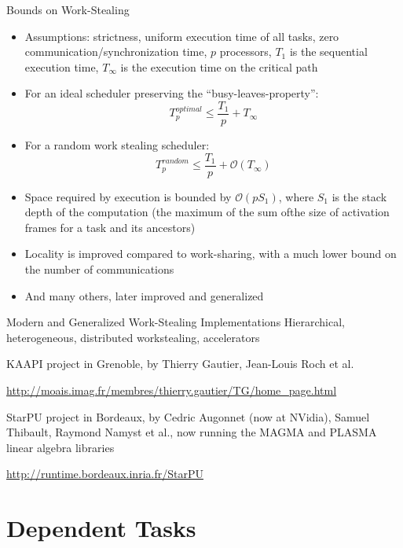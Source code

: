 \documentclass[xcolor=dvipsnames,9pt,mathserif]{beamer}
\def\le{\leqslant}
\begin{document}
\begin{frame}{Bounds on Work-Stealing}
  \begin{itemize}
  \item Assumptions: strictness, uniform execution time of all tasks,
    zero communication/synchronization time, $p$ processors, $T_1$ is
    the sequential execution time, $T_{\infty}$ is the execution time
    on the critical path
  \item For an ideal scheduler preserving the ``busy-leaves-property'':
    $$T^{\textit{optimal}}_p\le\frac{T_1}{p}+T_{\infty}$$
  \item For a random work stealing scheduler:
    $$T^{\textit{random}}_p\le\frac{T_1}{p}+\mathcal{O}(T_{\infty})$$
  \item Space required by execution is bounded by $\mathcal{O}(pS_1)$,
    where $S_1$ is the stack depth of the computation (the maximum of
    the sum ofthe size of activation frames for a task and its
    ancestors)
  \item Locality is improved compared to work-sharing, with a much
    lower bound on the number of communications
  \item And many others, later improved and generalized
  \end{itemize}
\end{frame}

\begin{frame}{Modern and Generalized Work-Stealing Implementations}
  Hierarchical, heterogeneous, distributed workstealing, accelerators

  \medskip
  KAAPI project in Grenoble, by Thierry Gautier, Jean-Louis Roch et al.
  
  \url{http://moais.imag.fr/membres/thierry.gautier/TG/home_page.html}
  
  \medskip
  StarPU project in Bordeaux, by Cedric Augonnet (now at
  NVidia), Samuel Thibault, Raymond Namyst et al., now running the
  MAGMA and PLASMA linear algebra libraries
  
  \url{http://runtime.bordeaux.inria.fr/StarPU}
\end{frame}

\section{Dependent Tasks}
\end{document}

